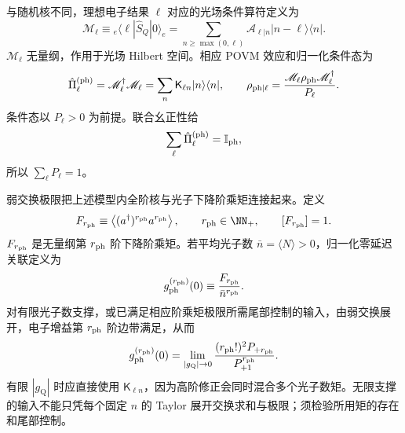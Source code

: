 \begin{exbox}
与随机核不同，理想电子结果 $\ell$ 对应的光场条件算符定义为
\begin{equation*}
\mathscr M_\ell
\equiv{}_e\!\langle\ell|\hat S_Q|0\rangle_e
=\sum_{n\ge\max(0,\ell)}
\mathcal A_{\ell|n}|n-\ell\rangle\langle n|.
\end{equation*}
$\mathscr M_\ell$ 无量纲，作用于光场 Hilbert 空间。相应 POVM 效应和归一化条件态为
\begin{equation}
{
\hat\Pi_\ell^{({\rm ph})}
=\mathscr M_\ell^\dagger\mathscr M_\ell
=\sum_n\mathsf K_{\ell n}|n\rangle\langle n|,
\qquad
\rho_{\rm ph|\ell}
=\frac{\mathscr M_\ell\rho_{\rm ph}\mathscr M_\ell^\dagger}{P_\ell}.}
\label{eq:single_electron_photon_instrument}
\end{equation}
条件态以 $P_\ell>0$ 为前提。联合幺正性给
\[
\sum_\ell \hat\Pi_\ell^{({\rm ph})}=\mathbb I_{\rm ph},
\]
所以 $\sum_\ell P_\ell=1$。

弱交换极限把上述模型内全阶核与光子下降阶乘矩连接起来。定义
\begin{equation*}
F_{r_{\rm ph}}
\equiv\left\langle
(a^\dagger)^{r_{\rm ph}}a^{r_{\rm ph}}
\right\rangle,
\qquad r_{\rm ph}\in\NN_+,
\qquad
[F_{r_{\rm ph}}]=1.
\end{equation*}
$F_{r_{\rm ph}}$ 是无量纲第 $r_{\rm ph}$ 阶下降阶乘矩。若平均光子数 $\bar n=\langle N\rangle>0$，归一化零延迟关联定义为
\begin{equation*}
g_{\rm ph}^{(r_{\rm ph})}(0)
\equiv\frac{F_{r_{\rm ph}}}{\bar n^{r_{\rm ph}}}.
\end{equation*}
对有限光子数支撑，或已满足相应阶乘矩极限所需尾部控制的输入，由弱交换展开，电子增益第 $r_{\rm ph}$ 阶边带满足，从而
\begin{equation}
{
g_{\rm ph}^{(r_{\rm ph})}(0)
=\lim_{|g_{\mathrm Q}|\to0}
\frac{(r_{\rm ph}!)^2P_{+r_{\rm ph}}}{P_{+1}^{r_{\rm ph}}}.}
\label{eq:electron_factorial_correlation_readout}
\end{equation}
有限 $|g_{\mathrm Q}|$ 时应直接使用 $\mathsf K_{\ell n}$，因为高阶修正会同时混合多个光子数矩。无限支撑的输入不能只凭每个固定 $n$ 的 Taylor 展开交换求和与极限；须检验所用矩的存在和尾部控制。

\medskip


\end{exbox}
